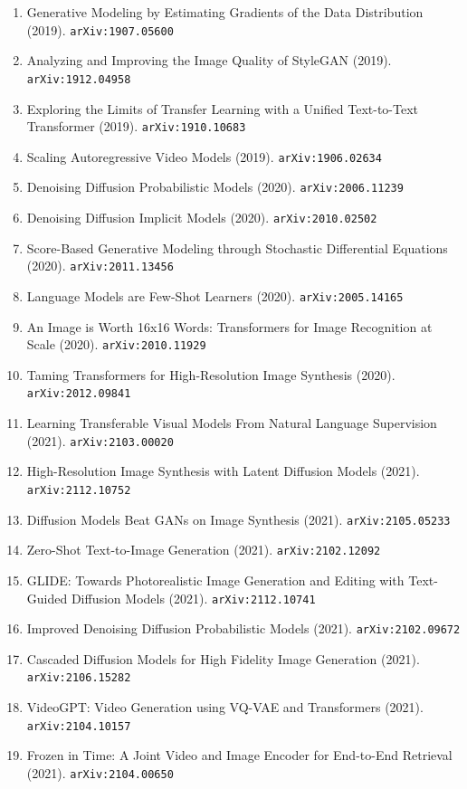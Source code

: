 \documentclass[11pt]{article}
\begin{document}
\begin{enumerate}
  of High-resolution Temporal GAN (2018). \texttt{arXiv:1811.09245}
  \item Generative Modeling by Estimating Gradients of the Data Distribution (2019). \texttt{arXiv:1907.05600}
  \item Analyzing and Improving the Image Quality of StyleGAN (2019). \texttt{arXiv:1912.04958}
  \item Exploring the Limits of Transfer Learning with a Unified Text-to-Text
  Transformer (2019). \texttt{arXiv:1910.10683}
  \item Scaling Autoregressive Video Models (2019). \texttt{arXiv:1906.02634}
  \item Denoising Diffusion Probabilistic Models (2020). \texttt{arXiv:2006.11239}
  \item Denoising Diffusion Implicit Models (2020). \texttt{arXiv:2010.02502}
  \item Score-Based Generative Modeling through Stochastic Differential
  Equations (2020). \texttt{arXiv:2011.13456}
  \item Language Models are Few-Shot Learners (2020). \texttt{arXiv:2005.14165}
  \item An Image is Worth 16x16 Words: Transformers for Image Recognition at
  Scale (2020). \texttt{arXiv:2010.11929}
  \item Taming Transformers for High-Resolution Image Synthesis (2020). \texttt{arXiv:2012.09841}
  \item Learning Transferable Visual Models From Natural Language Supervision (2021). \texttt{arXiv:2103.00020}
  \item High-Resolution Image Synthesis with Latent Diffusion Models (2021). \texttt{arXiv:2112.10752}
  \item Diffusion Models Beat GANs on Image Synthesis (2021). \texttt{arXiv:2105.05233}
  \item Zero-Shot Text-to-Image Generation (2021). \texttt{arXiv:2102.12092}
  \item GLIDE: Towards Photorealistic Image Generation and Editing with
  Text-Guided Diffusion Models (2021). \texttt{arXiv:2112.10741}
  \item Improved Denoising Diffusion Probabilistic Models (2021). \texttt{arXiv:2102.09672}
  \item Cascaded Diffusion Models for High Fidelity Image Generation (2021). \texttt{arXiv:2106.15282}
  \item VideoGPT: Video Generation using VQ-VAE and Transformers (2021). \texttt{arXiv:2104.10157}
  \item Frozen in Time: A Joint Video and Image Encoder for End-to-End Retrieval (2021). \texttt{arXiv:2104.00650}

\end{enumerate}
\end{document}
